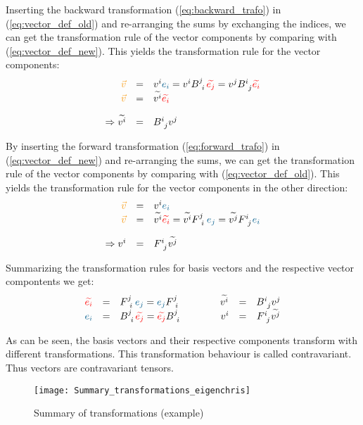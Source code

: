 Inserting the backward transformation (\ref{eq:backward_trafo}) in
(\ref{eq:vector_def_old}) and re-arranging the sums by exchanging the indices, we can get
the transformation rule of the vector components by comparing with
(\ref{eq:vector_def_new}). This yields the transformation rule for the vector components:
\begin{equation}
  \label{eq:vector_trafo_to_new}
  \begin{array}{rcl}
    \hdv & = & \hdvc{i} \hdbvc{i}
    = \hdvc{i} B^{j~}_{~i} \hdbtvc{j}
    = \hdvc{j} B^{i~}_{~j} \hdbtvc{i} \\
    \hdv & = & \hdtvc{i} \hdbtvc{i}
    \\ \noalign{\vskip10pt}
    \Rightarrow \hdtvc{i} & = & B^{i~}_{~j} \hdvc{j}
  \end{array}
\end{equation}

By inserting the forward transformation (\ref{eq:forward_trafo}) in
(\ref{eq:vector_def_new}) and re-arranging the sums, we can get the transformation rule of
the vector components by comparing with (\ref{eq:vector_def_old}). This yields the
transformation rule for the vector components in the other direction:
\begin{equation}
  \label{eq:vector_trafo_to_old}
  \begin{array}{rcl}
    \hdv & = & \hdvc{i} \hdbvc{i} \\
    \hdv & = & \hdtvc{i} \hdbtvc{i}
    = \hdtvc{i} F^{j~}_{~i}\hdbvc{j}
    = \hdtvc{j} F^{i~}_{~j}\hdbvc{i}\\
    \noalign{\vskip10pt}
    \Rightarrow \hdvc{i} & = &  F^{i~}_{~j} \hdtvc{j}
  \end{array}
\end{equation}

Summarizing the transformation rules for basis vectors and the respective vector
compontents we get:
\begin{equation}
  \label{eq:vector_trafo_overview}
  \begin{array}{rclrcl}
    \hdbtvc{i} & = &
    F^{j~}_{~i}\hdbvc{j} = \hdbvc{j} F^{j~}_{~i} \qquad\qquad
    \hdtvc{i} & = & B^{i~}_{~j} \hdvc{j} \\
    \hdbvc{i} & = &
    B^{j~}_{~i}\hdbtvc{j} = \hdbtvc{j} B^{j~}_{~i} \qquad\qquad
    \hdvc{i} & = &  F^{i~}_{~j} \hdtvc{j}
  \end{array}
\end{equation}

As can be seen, the basis vectors and their respective components transform with different
transformations. This transformation behaviour is called contravariant. Thus vectors are
contravariant tensors. \\
\begin{figure}[h]
  \centering
  \texttt{[image: Summary\_transformations\_eigenchris]}
  \caption{Summary of transformations (example)}
  \label{fig:transformation_summary_example}
\end{figure}

